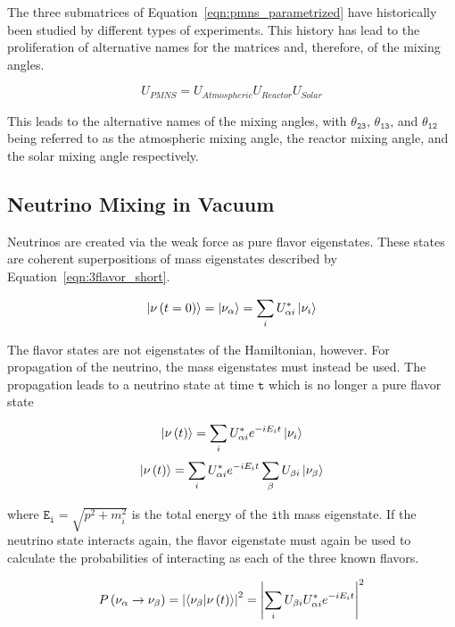 The three submatrices of Equation~\ref{eqn:pmns_parametrized} have historically been studied by different types of experiments. 
This history has lead to the proliferation of alternative names for the matrices and, therefore, of the mixing angles.

\begin{equation}
U_{PMNS} = U_{Atmospheric} U_{Reactor} U_{Solar}
\end{equation}

This leads to the alternative names of the mixing angles, with $\mathtt{\theta_{23}}$, $\mathtt{\theta_{13}}$, and $\mathtt{\theta_{12}}$ being referred to as the atmospheric mixing angle, the reactor mixing angle, and the solar mixing angle respectively.

\label{subsec:vacuum}
\subsection{Neutrino Mixing in Vacuum}
Neutrinos are created via the weak force as pure flavor eigenstates. 
These states are coherent superpositions of mass eigenstates described by Equation~\ref{eqn:3flavor_short}.

\begin{equation}
\ket{\nu\left(t=0\right)} = \ket{\nu_\alpha} = \sum_i U_{\alpha i}^* \ket{\nu_i}
\end{equation}

The flavor states are not eigenstates of the Hamiltonian, however.
For propagation of the neutrino, the mass eigenstates must instead be used.
The propagation leads to a neutrino state at time $\mathtt{t}$ which is no longer a pure flavor state

\begin{equation}
\ket{\nu\left(t\right)} = \sum_i U^*_{\alpha i} e^{-iE_i t} \ket{\nu_i}
\end{equation}
\begin{equation}
\ket{\nu\left(t\right)} = \sum_i U^*_{\alpha i} e^{-iE_i t} \sum_{\beta} U_{\beta i} \ket{\nu_\beta}
\end{equation}

where $\mathtt{E_i} = \sqrt{p^2+m_i^2}$ is the total energy of the $\mathtt{i}$th mass eigenstate.
If the neutrino state interacts again, the flavor eigenstate must again be used to calculate the probabilities of interacting as each of the three known flavors.

\begin{equation}
P\left(\nu_\alpha\rightarrow\nu_\beta\right) = \left|\bra{\nu_\beta}\ket{\nu\left(t\right)}\right|^2 
                 															= \left|\sum_i U_{\beta i} U^*_{\alpha i} e^{-i E_i t} \right|^2
\label{eqn:pmns_probability}
\end{equation}


